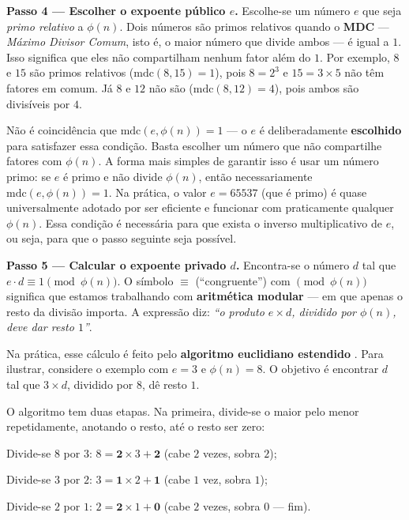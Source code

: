 \textbf{Passo 4 --- Escolher o expoente público $e$.} Escolhe-se um número $e$ que seja \textit{primo relativo} a $\phi(n)$. Dois números são primos relativos quando o \textbf{MDC} --- \textit{Máximo Divisor Comum}, isto é, o maior número que divide ambos --- é igual a $1$. Isso significa que eles não compartilham nenhum fator além do $1$. Por exemplo, $8$ e $15$ são primos relativos ($\text{mdc}(8, 15) = 1$), pois $8 = 2^3$ e $15 = 3 \times 5$ não têm fatores em comum. Já $8$ e $12$ não são ($\text{mdc}(8, 12) = 4$), pois ambos são divisíveis por $4$.

Não é coincidência que $\text{mdc}(e, \phi(n)) = 1$ --- o $e$ é deliberadamente \textbf{escolhido} para satisfazer essa condição. Basta escolher um número que não compartilhe fatores com $\phi(n)$. A forma mais simples de garantir isso é usar um número primo: se $e$ é primo e não divide $\phi(n)$, então necessariamente $\text{mdc}(e, \phi(n)) = 1$. Na prática, o valor $e = 65537$ (que é primo) é quase universalmente adotado por ser eficiente e funcionar com praticamente qualquer $\phi(n)$. Essa condição é necessária para que exista o inverso multiplicativo de $e$, ou seja, para que o passo seguinte seja possível.

\textbf{Passo 5 --- Calcular o expoente privado $d$.} Encontra-se o número $d$ tal que $e \cdot d \equiv 1 \pmod{\phi(n)}$. O símbolo $\equiv$ (``congruente'') com $\pmod{\phi(n)}$ significa que estamos trabalhando com \textbf{aritmética modular} --- em que apenas o resto da divisão importa. A expressão diz: \textit{``o produto $e \times d$, dividido por $\phi(n)$, deve dar resto $1$''}.

Na prática, esse cálculo é feito pelo \textbf{algoritmo euclidiano estendido} \cite{tomaz2014}. Para ilustrar, considere o exemplo com $e = 3$ e $\phi(n) = 8$. O objetivo é encontrar $d$ tal que $3 \times d$, dividido por $8$, dê resto $1$.

O algoritmo tem duas etapas. Na primeira, divide-se o maior pelo menor repetidamente, anotando o resto, até o resto ser zero:

\begin{alineas}
    \item Divide-se $8$ por $3$: $8 = \mathbf{2} \times 3 + \mathbf{2}$ (cabe $2$ vezes, sobra $2$);
    \item Divide-se $3$ por $2$: $3 = \mathbf{1} \times 2 + \mathbf{1}$ (cabe $1$ vez, sobra $1$);
    \item Divide-se $2$ por $1$: $2 = \mathbf{2} \times 1 + \mathbf{0}$ (cabe $2$ vezes, sobra $0$ --- fim).
\end{alineas}


